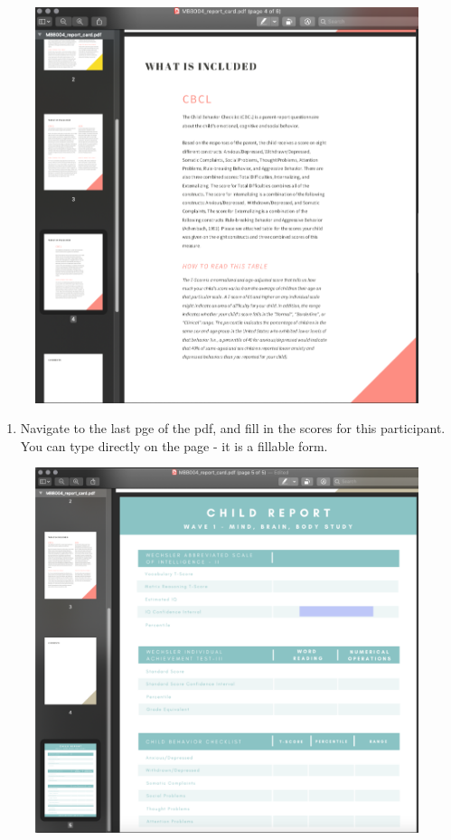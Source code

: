 \documentclass[]{book}
\providecommand{\tightlist}{%
  \setlength{\itemsep}{0pt}\setlength{\parskip}{0pt}}
\begin{document}
\begin{figure}
\centering
\includegraphics{images/final_checklist/report_cards/3.png}
\caption{}
\end{figure}

\begin{enumerate}
\def\labelenumi{\arabic{enumi}.}
\setcounter{enumi}{3}
\tightlist
\item
  Navigate to the last pge of the pdf, and fill in the scores for this participant. You can type directly on the page - it is a fillable form.
\end{enumerate}

\begin{figure}
\centering
\includegraphics{images/final_checklist/report_cards/4.png}
\caption{}
\end{figure}
\end{document}
